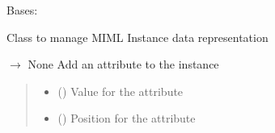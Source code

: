 \documentclass[letterpaper,10pt,english]{sphinxmanual}
\begin{document}
\begin{fulllineitems}
\label{\detokenize{data/_autosummary/miml.data.instance.Instance:miml.data.instance.Instance}}
\pysigstartsignatures
\pysiglinewithargsret
{}
{\sphinxparamcomma {}}
{}
\pysigstopsignatures
\sphinxAtStartPar
Bases: 

\sphinxAtStartPar
Class to manage MIML Instance data representation

\begin{fulllineitems}
\label{\detokenize{data/_autosummary/miml.data.instance.Instance:miml.data.instance.Instance.add_attribute}}
\pysigstartsignatures
\pysiglinewithargsret
{}
{\sphinxparamcomma {}}
{{ $\rightarrow$ None}}
\pysigstopsignatures
\sphinxAtStartPar
Add an attribute to the instance
\begin{quote}\begin{description}
\begin{itemize}
\item {} 
\sphinxAtStartPar
{} (\sphinxstyleliteralemphasis{\sphinxupquote{, }}) \textendash{} Value for the attribute

\item {} 
\sphinxAtStartPar
{} (\sphinxstyleliteralemphasis{\sphinxupquote{, }}) \textendash{} Position for the attribute

\end{itemize}

\end{description}\end{quote}


\end{fulllineitems}
\end{fulllineitems}
\end{document}

